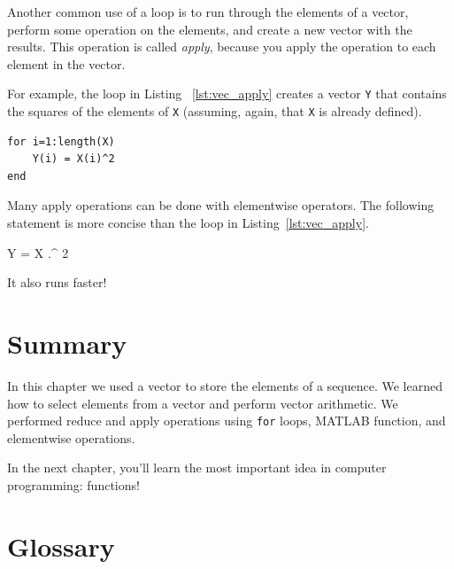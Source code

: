 Another common use of a loop is to run through the elements of
a vector, perform some operation on the elements, and create
a new vector with the results.  This operation is called
\emph{apply}, because you apply the operation to each element in
the vector.


For example, the loop in Listing ~\ref{lst:vec_apply} creates a vector {\tt Y} that
contains the squares of the elements of {\tt X} (assuming, again, that {\tt X} is already defined).

\begin{lstlisting}[caption={Making a new vector Y by squaring the elements in X }, label={lst:vec_apply}]
for i=1:length(X)
    Y(i) = X(i)^2
end
\end{lstlisting}

Many apply operations can be done with elementwise operators.
The following statement is more concise than the loop in
Listing~\ref{lst:vec_apply}.

\begin{code}
Y = X .^ 2
\end{code}

It also runs faster!


\section{Summary}

In this chapter we used a vector to store the elements of a sequence.  We learned how to select elements from a vector and perform vector arithmetic.  We performed reduce and apply operations using {\tt for} loops, MATLAB function, and elementwise operations.

In the next chapter, you'll learn the most important idea in computer programming: functions!


\section{Glossary}

